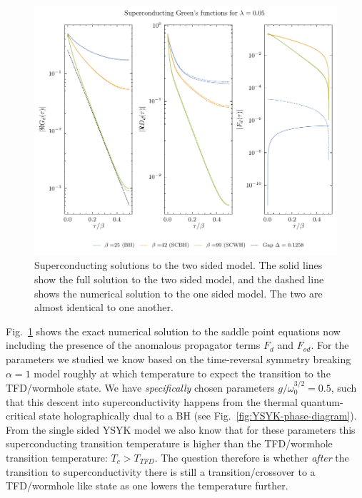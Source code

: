 \begin{figure}[t!]
    \centering
    \includegraphics[width=\linewidth]{figures/chapter3/SupCondFigs.pdf}
    \caption{Superconducting solutions to the two sided model. The solid lines show the full solution to the two sided model, and the dashed line shows the numerical solution to the one sided model. The two are almost identical to one another.}
    \label{fig:SuperconductingGFsImagTime}
\end{figure}

Fig.~\ref{fig:SuperconductingGFsImagTime} shows the exact numerical solution to the saddle point equations now including the presence of the anomalous propagator terms $F_d$ and $F_{od}$. 
For the parameters we studied we know based on the time-reversal symmetry breaking $\alpha=1$ model roughly at which temperature to expect the transition to the TFD/wormhole state. 
We have {\em specifically} chosen parameters $g/\omega_0^{3/2} =0.5$, 
such that this descent into superconductivity happens from the thermal quantum-critical state holographically dual to a BH (see Fig.~\ref{fig:YSYK-phase-diagram}). From the single sided YSYK model we also know that for these parameters this superconducting transition temperature is higher than the TFD/wormhole transition temperature: $T_c > T_{TFD}$.
The question therefore is whether {\em after} the transition to superconductivity there is still a transition/crossover to a TFD/wormhole like state as one lowers the temperature further.


